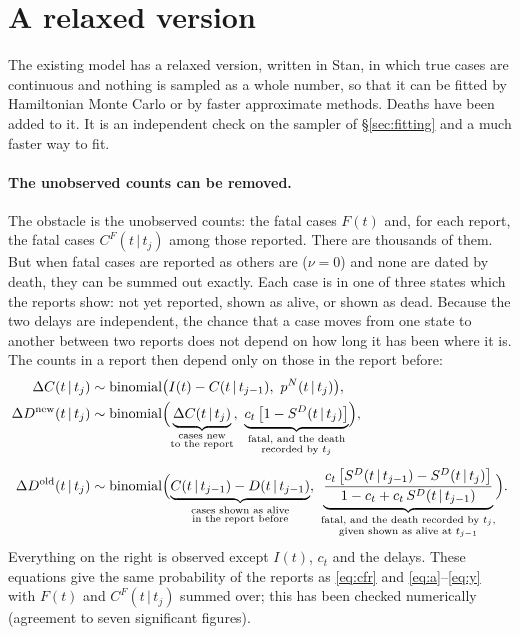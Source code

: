 \documentclass[11pt,a4paper]{article}
\newcommand{\given}{\,|\,}
\newcommand{\bin}{\operatorname{binomial}}
\newcommand{\dnew}{\Delta D^{\mathrm{new}}}
\newcommand{\dold}{\Delta D^{\mathrm{old}}}
\begin{document}
\section{A relaxed version}\label{sec:relaxed}

The existing model has a relaxed version, written in Stan, in which true
cases are continuous and nothing is sampled as a whole number, so that it
can be fitted by Hamiltonian Monte Carlo or by faster approximate methods.
Deaths have been added to it. It is an independent check on the sampler of
\S\ref{sec:fitting} and a much faster way to fit.

\paragraph{The unobserved counts can be removed.} The obstacle is the
unobserved counts: the fatal cases $F(t)$ and, for each report, the fatal
cases $C^{F}(t\given t_j)$ among those reported. There are thousands of
them. But when fatal cases are reported as others are ($\nu=0$) and none
are dated by death, they can be summed out exactly. Each case is in one of
three states which the reports show: not yet reported, shown as alive, or
shown as dead. Because the two delays are independent, the chance that a
case moves from one state to another between two reports does not depend on
how long it has been where it is. The counts in a report then depend only on
those in the report before:
\begin{align}
\Delta C(t\given t_j) &\sim\bin\bigl(I(t)-C(t\given t_{j-1}),\ p^{N}(t\given t_j)\bigr),
 \nonumber\\
\dnew(t\given t_j) &\sim\bin\Bigl(
 \underbrace{\Delta C(t\given t_j)}_{\substack{\text{cases new}\\ \text{to the report}}},\
 \underbrace{c_t\,\bigl[1-S^{D}(t\given t_j)\bigr]}_{\substack{\text{fatal, and the death}\\ \text{recorded by } t_j}}
 \Bigr),\label{eq:lumpnew}\\[1ex]
\dold(t\given t_j) &\sim\bin\Bigl(
 \underbrace{C(t\given t_{j-1})-D(t\given t_{j-1})}_{\substack{\text{cases shown as alive}\\ \text{in the report before}}},\
 \underbrace{\frac{c_t\,\bigl[S^{D}(t\given t_{j-1})-S^{D}(t\given t_j)\bigr]}
 {1-c_t+c_t\,S^{D}(t\given t_{j-1})}}_{\substack{\text{fatal, and the death recorded by } t_j\text{,}\\ \text{given shown as alive at } t_{j-1}}}
 \Bigr).\label{eq:lumpold}
\end{align}
Everything on the right is observed except $I(t)$, $c_t$ and the delays.
These equations give the same probability of the reports as
\eqref{eq:cfr} and \eqref{eq:a}--\eqref{eq:y} with $F(t)$ and
$C^{F}(t\given t_j)$ summed over; this has been checked numerically
(agreement to seven significant figures).
\end{document}
